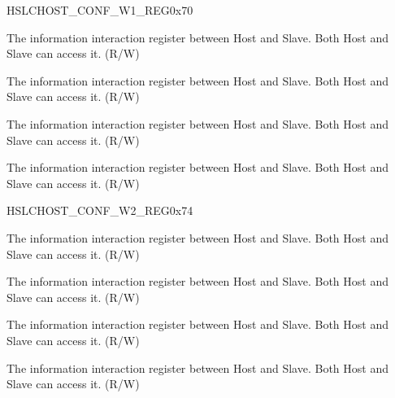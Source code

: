 \begin{register}{H}{SLCHOST\_CONF\_W1\_REG}{0x70}\label{regdesc:SLCHOSTCONFW1REG}
%
%
%
%
\regnewline%
\begin{regdesc}\begin{reglist}
\item [SLCHOST\_CONF7]The information interaction register between Host and Slave. Both Host and Slave can access it. (R/W)
\item [SLCHOST\_CONF6]The information interaction register between Host and Slave. Both Host and Slave can access it. (R/W)
\item [SLCHOST\_CONF5]The information interaction register between Host and Slave. Both Host and Slave can access it. (R/W)
\item [SLCHOST\_CONF4]The information interaction register between Host and Slave. Both Host and Slave can access it. (R/W)
\end{reglist}\end{regdesc}
\end{register}


\begin{register}{H}{SLCHOST\_CONF\_W2\_REG}{0x74}\label{regdesc:SLCHOSTCONFW2REG}
%
%
%
%
\regnewline%
\begin{regdesc}\begin{reglist}
\item [SLCHOST\_CONF11]The information interaction register between Host and Slave. Both Host and Slave can access it. (R/W)
\item [SLCHOST\_CONF10]The information interaction register between Host and Slave. Both Host and Slave can access it. (R/W)
\item [SLCHOST\_CONF9]The information interaction register between Host and Slave. Both Host and Slave can access it. (R/W)
\item [SLCHOST\_CONF8]The information interaction register between Host and Slave. Both Host and Slave can access it. (R/W)
\end{reglist}\end{regdesc}
\end{register}


